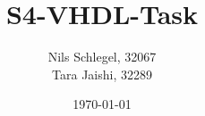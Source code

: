 \documentclass[a4paper,12pt]{book}
\begin{document}
\title{S4-VHDL-Task}
\author{Nils Schlegel, 32067\\Tara Jaishi, 32289}
\date{\today}
\maketitle %

\setcounter{chapter}{0}

\begin{center}
    
\end{center}
\end{document}
